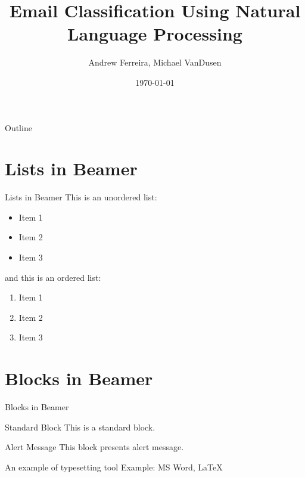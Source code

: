 \documentclass{beamer}
\title{Email Classification Using Natural Language Processing}
\author{Andrew Ferreira, Michael VanDusen}
\date{\today}
\begin{document}

\begin{frame}
    \titlepage 
\end{frame}
\logo{}
\begin{frame}{Outline}
    \tableofcontents
\end{frame}
\section{Lists in Beamer}
\begin{frame}{Lists in Beamer}
This is an unordered list:
\begin{itemize}
    \item Item 1
    \item Item 2
    \item Item 3
\end{itemize}
and this is an ordered list:
\begin{enumerate}
    \item Item 1
    \item Item 2
    \item Item 3
\end{enumerate}
\end{frame}
\section{Blocks in Beamer}
\begin{frame}{Blocks in Beamer}
    \begin{block}{Standard Block}
        This is a standard block.
    \end{block}
    \begin{alertblock}{Alert Message}
        This block presents alert message.
    \end{alertblock}
    \begin{exampleblock}{An example of typesetting tool}
        Example: MS Word, \LaTeX{}
    \end{exampleblock}
\end{frame} 
\end{document}
